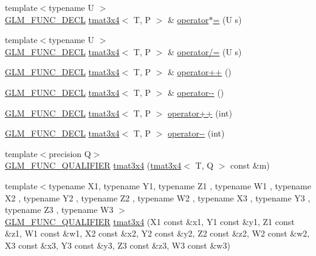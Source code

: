 \begin{DoxyCompactItemize}
{\footnotesize template$<$typename U $>$ }\\\hyperlink{setup_8hpp_ab2d052de21a70539923e9bcbf6e83a51}{G\+L\+M\+\_\+\+F\+U\+N\+C\+\_\+\+D\+E\+CL} \hyperlink{structglm_1_1detail_1_1tmat3x4}{tmat3x4}$<$ T, P $>$ \& \hyperlink{structglm_1_1detail_1_1tmat3x4_ab07ee1da7bbf72d894107d5ea90b4b50}{operator$\ast$=} (U s)
\item 
{\footnotesize template$<$typename U $>$ }\\\hyperlink{setup_8hpp_ab2d052de21a70539923e9bcbf6e83a51}{G\+L\+M\+\_\+\+F\+U\+N\+C\+\_\+\+D\+E\+CL} \hyperlink{structglm_1_1detail_1_1tmat3x4}{tmat3x4}$<$ T, P $>$ \& \hyperlink{structglm_1_1detail_1_1tmat3x4_a0fa10e45cfa4cee78245916ac325150e}{operator/=} (U s)
\item 
\hyperlink{setup_8hpp_ab2d052de21a70539923e9bcbf6e83a51}{G\+L\+M\+\_\+\+F\+U\+N\+C\+\_\+\+D\+E\+CL} \hyperlink{structglm_1_1detail_1_1tmat3x4}{tmat3x4}$<$ T, P $>$ \& \hyperlink{structglm_1_1detail_1_1tmat3x4_a26b88699223e57ea3523a51f76e00dba}{operator++} ()
\item 
\hyperlink{setup_8hpp_ab2d052de21a70539923e9bcbf6e83a51}{G\+L\+M\+\_\+\+F\+U\+N\+C\+\_\+\+D\+E\+CL} \hyperlink{structglm_1_1detail_1_1tmat3x4}{tmat3x4}$<$ T, P $>$ \& \hyperlink{structglm_1_1detail_1_1tmat3x4_a0537b06d951dd3e6ea5da5c6cd1dc1e5}{operator-\/-\/} ()
\item 
\hyperlink{setup_8hpp_ab2d052de21a70539923e9bcbf6e83a51}{G\+L\+M\+\_\+\+F\+U\+N\+C\+\_\+\+D\+E\+CL} \hyperlink{structglm_1_1detail_1_1tmat3x4}{tmat3x4}$<$ T, P $>$ \hyperlink{structglm_1_1detail_1_1tmat3x4_a0d29f6cf76c014e585bf389397fb1db6}{operator++} (int)
\item 
\hyperlink{setup_8hpp_ab2d052de21a70539923e9bcbf6e83a51}{G\+L\+M\+\_\+\+F\+U\+N\+C\+\_\+\+D\+E\+CL} \hyperlink{structglm_1_1detail_1_1tmat3x4}{tmat3x4}$<$ T, P $>$ \hyperlink{structglm_1_1detail_1_1tmat3x4_a681cace6d7cfc6b5b96c076fefd47e11}{operator-\/-\/} (int)
\item 
{\footnotesize template$<$precision Q$>$ }\\\hyperlink{setup_8hpp_a33fdea6f91c5f834105f7415e2a64407}{G\+L\+M\+\_\+\+F\+U\+N\+C\+\_\+\+Q\+U\+A\+L\+I\+F\+I\+ER} \hyperlink{structglm_1_1detail_1_1tmat3x4_affba87d33eccb3e78c8629791c7fc158}{tmat3x4} (\hyperlink{structglm_1_1detail_1_1tmat3x4}{tmat3x4}$<$ T, Q $>$ const \&m)
\item 
{\footnotesize template$<$typename X1, typename Y1, typename Z1 , typename W1 , typename X2 , typename Y2 , typename Z2 , typename W2 , typename X3 , typename Y3 , typename Z3 , typename W3 $>$ }\\\hyperlink{setup_8hpp_a33fdea6f91c5f834105f7415e2a64407}{G\+L\+M\+\_\+\+F\+U\+N\+C\+\_\+\+Q\+U\+A\+L\+I\+F\+I\+ER} \hyperlink{structglm_1_1detail_1_1tmat3x4_a16b2c248a1909f7f319b8e050f93e3b4}{tmat3x4} (X1 const \&x1, Y1 const \&y1, Z1 const \&z1, W1 const \&w1, X2 const \&x2, Y2 const \&y2, Z2 const \&z2, W2 const \&w2, X3 const \&x3, Y3 const \&y3, Z3 const \&z3, W3 const \&w3)

\end{DoxyCompactItemize}
